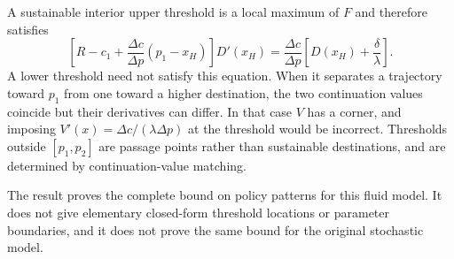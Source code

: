 \documentclass[11pt]{article}
\begin{document}
A sustainable interior upper threshold is a local maximum of $F$ and
therefore satisfies
\begin{equation*}
\left[R-c_1+\frac{\Delta c}{\Delta p}(p_1-x_H)\right]D'(x_H)
=\frac{\Delta c}{\Delta p}\left[D(x_H)+\frac\delta\lambda\right].
\end{equation*}
A lower threshold need not satisfy this equation. When it separates a
trajectory toward $p_1$ from one toward a higher destination, the two
continuation values coincide but their derivatives can differ. In that
case $V$ has a corner, and imposing
$V'(x)=\Delta c/(\lambda\Delta p)$ at the threshold would be incorrect.
Thresholds outside $[p_1,p_2]$ are passage points rather than sustainable
destinations, and are determined by continuation-value matching.

The result proves the complete bound on policy patterns for this fluid
model. It does not give elementary closed-form threshold locations or
parameter boundaries, and it does not prove the same bound for the
original stochastic model.
\end{document}
